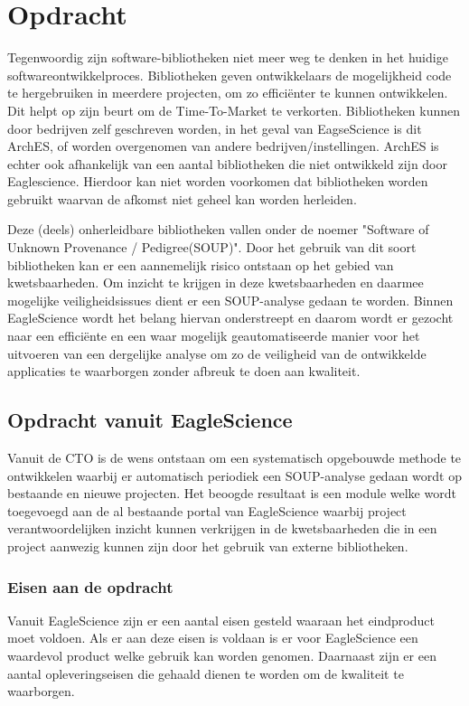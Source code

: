 
\chapter{Opdracht}\label{ch:opdracht} %


Tegenwoordig zijn software-bibliotheken niet meer weg te denken in het huidige software\-ontwikkelproces. Bibliotheken geven ontwikkelaars de mogelijkheid code te hergebruiken in meerdere projecten, om zo efficiënter te kunnen ontwikkelen. Dit helpt op zijn beurt om de Time-To-Market te verkorten. Bibliotheken kunnen door bedrijven zelf geschreven worden, in het geval van EagseScience is dit ArchES, of worden overgenomen van andere bedrijven/instellingen. ArchES is echter ook afhankelijk van een aantal bibliotheken die niet ontwikkeld zijn door Eaglescience. Hierdoor kan niet worden voorkomen dat bibliotheken worden gebruikt waarvan de afkomst niet geheel kan worden herleiden.

Deze (deels) onherleidbare bibliotheken vallen onder de noemer "Software of Unknown Provenance / Pedigree(SOUP)". Door het gebruik van dit soort bibliotheken kan er een aannemelijk risico ontstaan op het gebied van kwetsbaarheden. Om inzicht te krijgen in deze kwetsbaarheden en daarmee mogelijke veiligheidsissues dient er een SOUP-analyse gedaan te worden. Binnen EagleScience wordt het belang hiervan onderstreept en daarom wordt er gezocht naar een efficiënte en een waar mogelijk geautomatiseerde manier voor het uitvoeren van een dergelijke analyse om zo de veiligheid van de ontwikkelde applicaties te waarborgen zonder afbreuk te doen aan kwaliteit.

\section{Opdracht vanuit EagleScience}\label{sec:opdracht-vanuit-EagleScience}
Vanuit de CTO is de wens ontstaan om een systematisch opgebouwde methode te ontwikkelen waarbij er automatisch periodiek een SOUP-analyse gedaan wordt op bestaande en nieuwe projecten. Het beoogde resultaat is een module welke wordt toegevoegd aan de al bestaande portal van EagleScience waarbij project verantwoordelijken inzicht kunnen verkrijgen in de kwetsbaarheden die in een project aanwezig kunnen zijn door het gebruik van externe bibliotheken.

\subsection{Eisen aan de opdracht}\label{subsec: eisen-aan-de-opdracht}
Vanuit EagleScience zijn er een aantal eisen gesteld waaraan het eindproduct moet voldoen. Als er aan deze eisen is voldaan is er voor EagleScience een waardevol product welke gebruik kan worden genomen. Daarnaast zijn er een aantal opleveringseisen die gehaald dienen te worden om de kwaliteit te waarborgen.

